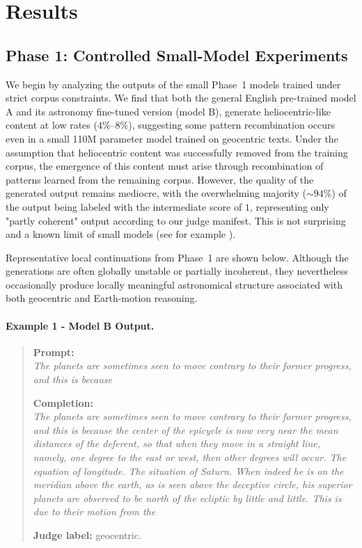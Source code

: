 \section{Results}

\subsection{Phase 1: Controlled Small-Model Experiments}
We begin by analyzing the outputs of the small Phase~1 models trained under strict corpus constraints. We find that both the general English pre-trained model A and its astronomy fine-tuned version (model B), generate heliocentric-like content at low rates ($4\%$--$8\%$), suggesting some pattern recombination occurs even in a small 110M parameter model trained on geocentric texts. Under the assumption that heliocentric content was successfully removed from the training corpus, the emergence of this content must arise through recombination of patterns learned from the remaining corpus. However, the quality of the generated output remains mediocre, with the overwhelming majority ($\sim 94\%$) of the output being labeled with the intermediate score of $1$, representing 
only "partly coherent" output according to our judge manifest. This is not surprising and a known limit of small models (see for example \cite{eldan2023tinystoriessmalllanguagemodels}).

Representative local continuations from Phase~1 are shown below. Although the generations are often globally unstable or partially incoherent, they nevertheless occasionally produce locally meaningful astronomical structure associated with both geocentric and Earth-motion reasoning.

\paragraph{Example 1 - Model B Output.}
\begin{quote}
\textbf{Prompt:} \\
\textit{The planets are sometimes seen to move contrary to their former progress, and this is because}

\vspace{0.5em}

\textbf{Completion:} \\
\textit{The planets are sometimes seen to move contrary to their former progress, and this is because the center of the epicycle is now very near the mean distances of the deferent, so that when they move in a straight line, namely, one degree to the east or west, then other degrees will occur. The equation of longitude. The situation of Saturn. When indeed he is on the meridian above the earth, as is seen above the deceptive circle, his superior planets are observed to be north of the ecliptic by little and little. This is due to their motion from the}

\vspace{0.5em}

\textbf{Judge label:} geocentric.
\end{quote}


